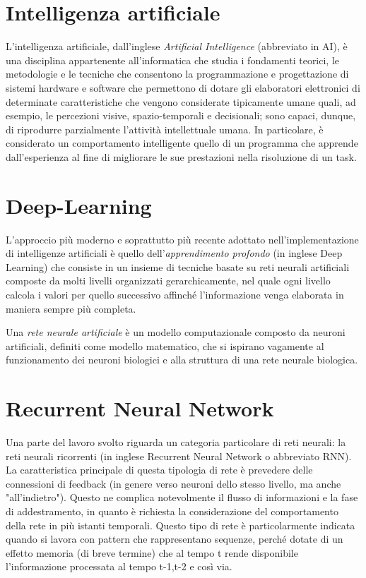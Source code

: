 \section{Intelligenza artificiale}
\cite{boutell2004learning}
L'intelligenza artificiale, dall'inglese \textit{Artificial Intelligence} (abbreviato in AI), è una disciplina appartenente all'informatica che studia i fondamenti teorici, le metodologie e le tecniche che consentono la programmazione e progettazione di sistemi hardware e software che permettono di dotare gli elaboratori elettronici di determinate caratteristiche che vengono considerate tipicamente umane quali, ad esempio, le percezioni visive, spazio-temporali e decisionali; sono capaci, dunque, di riprodurre parzialmente l'attività intellettuale umana. In particolare, è considerato un comportamento intelligente quello di un programma che apprende dall'esperienza al fine di migliorare le sue prestazioni nella risoluzione di un task.
\section{Deep-Learning}
L'approccio più moderno e soprattutto più recente adottato nell'implementazione di intelligenze artificiali è quello dell'\textit{apprendimento profondo} (in inglese Deep Learning) che consiste in un insieme di tecniche basate su reti neurali artificiali composte da molti livelli organizzati gerarchicamente, nel quale ogni livello calcola i valori per quello successivo affinché l'informazione venga elaborata in maniera sempre più completa.

Una \textit{rete neurale artificiale} è un modello computazionale composto da neuroni artificiali, definiti come modello matematico, che si ispirano vagamente al funzionamento dei neuroni biologici e alla struttura di una rete neurale biologica.

\section{Recurrent Neural Network}
Una parte del lavoro svolto riguarda un categoria particolare di reti neurali: la reti neurali ricorrenti (in inglese Recurrent Neural Network o abbreviato RNN).
La caratteristica principale di questa tipologia di rete è prevedere delle connessioni di feedback (in genere verso neuroni dello stesso livello, ma anche "all'indietro"). Questo ne complica notevolmente il flusso di informazioni e la fase di addestramento, in quanto è richiesta la considerazione del comportamento della rete in più istanti temporali. Questo tipo di rete è particolarmente indicata quando si lavora con pattern che rappresentano sequenze, perché dotate di un effetto memoria (di breve termine) che al tempo t rende disponibile l'informazione processata al tempo t-1,t-2 e così via. 

